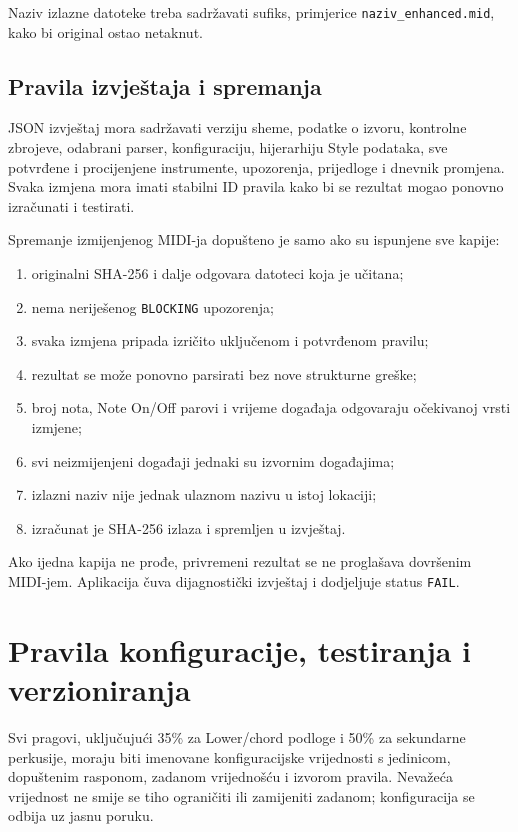 \documentclass[11pt]{article}
\begin{document}
Naziv izlazne datoteke treba sadržavati sufiks, primjerice
\texttt{naziv\_enhanced.mid}, kako bi original ostao netaknut.

\subsection{Pravila izvještaja i spremanja}

JSON izvještaj mora sadržavati verziju sheme, podatke o izvoru, kontrolne
zbrojeve, odabrani parser, konfiguraciju, hijerarhiju Style podataka, sve
potvrđene i procijenjene instrumente, upozorenja, prijedloge i dnevnik promjena.
Svaka izmjena mora imati stabilni ID pravila kako bi se rezultat mogao ponovno
izračunati i testirati.

Spremanje izmijenjenog MIDI-ja dopušteno je samo ako su ispunjene sve kapije:

\begin{enumerate}[label=E\arabic*.]
    \item originalni SHA-256 i dalje odgovara datoteci koja je učitana;
    \item nema neriješenog \texttt{BLOCKING} upozorenja;
    \item svaka izmjena pripada izričito uključenom i potvrđenom pravilu;
    \item rezultat se može ponovno parsirati bez nove strukturne greške;
    \item broj nota, Note On/Off parovi i vrijeme događaja odgovaraju očekivanoj
    vrsti izmjene;
    \item svi neizmijenjeni događaji jednaki su izvornim događajima;
    \item izlazni naziv nije jednak ulaznom nazivu u istoj lokaciji;
    \item izračunat je SHA-256 izlaza i spremljen u izvještaj.
\end{enumerate}

Ako ijedna kapija ne prođe, privremeni rezultat se ne proglašava dovršenim
MIDI-jem. Aplikacija čuva dijagnostički izvještaj i dodjeljuje status
\texttt{FAIL}.

\section{Pravila konfiguracije, testiranja i verzioniranja}

Svi pragovi, uključujući 35\% za Lower/chord podloge i 50\% za sekundarne
perkusije, moraju biti imenovane konfiguracijske vrijednosti s jedinicom,
dopuštenim rasponom, zadanom vrijednošću i izvorom pravila. Nevažeća vrijednost
ne smije se tiho ograničiti ili zamijeniti zadanom; konfiguracija se odbija uz
jasnu poruku.
\end{document}
